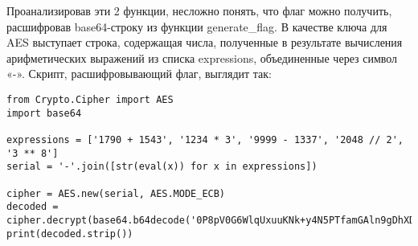 Проанализировав эти 2 функции, несложно понять, что флаг можно получить, расшифровав base64-строку из функции generate\_flag. В качестве ключа для AES выступает строка, содержащая числа, полученные в результате вычисления арифметических выражений из списка expressions, объединенные через символ «-». Скрипт, расшифровывающий флаг, выглядит так:

\begin{verbatim}
from Crypto.Cipher import AES
import base64

expressions = ['1790 + 1543', '1234 * 3', '9999 - 1337', '2048 // 2', '3 ** 8']
serial = '-'.join([str(eval(x)) for x in expressions])

cipher = AES.new(serial, AES.MODE_ECB)
decoded = cipher.decrypt(base64.b64decode('0P8pV0G6WlqUxuuKNk+y4N5PTfamGAln9gDhXDxi5rM='))
print(decoded.strip())
\end{verbatim}

